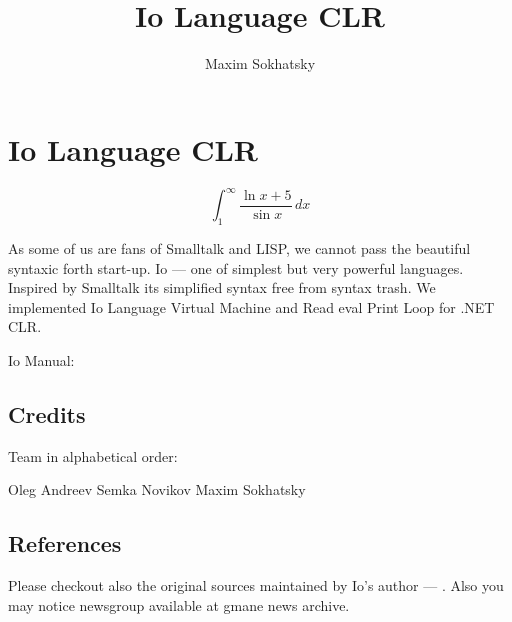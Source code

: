 \documentclass[11pt]{article}
\begin{document}

\title{Io Language CLR}
\author{Maxim Sokhatsky}

\paragraph{}
\section*{Io Language CLR}

\begin{displaymath}
\int_1^\infty{\frac{\ln{x}+5}{\sin{x}}}\,dx
\end{displaymath}

As some of us are fans of Smalltalk and LISP, we cannot pass the 
beautiful syntaxic forth start-up. Io --- one of simplest but very powerful
languages. Inspired by Smalltalk its simplified syntax free from
syntax trash. We implemented Io Language Virtual Machine and Read
eval Print Loop for .NET CLR.

Io Manual: 

\subsection*{Credits}

Team in alphabetical order:

Oleg Andreev \@br
Semka Novikov \@br
Maxim Sokhatsky                                                                                                   

\subsection*{References}

Please checkout also the original  sources maintained by
Io's author --- . Also you may notice 
newsgroup available at gmane news archive.


\end{document}
